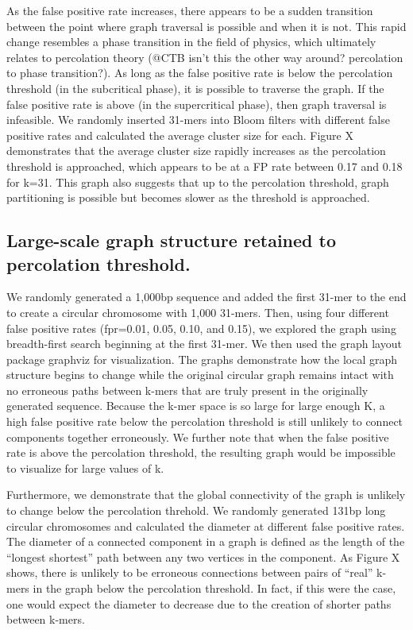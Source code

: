 \documentclass[12pt]{article} \usepackage{simplemargins}
\begin{document}
As the false positive rate increases, there appears to be a sudden
transition between the point where graph traversal is possible and
when it is not. This rapid change resembles a phase transition in the
field of physics, which ultimately relates to percolation theory (@CTB
isn't this the other way around? percolation to phase transition?). As
long as the false positive rate is below the percolation threshold (in
the subcritical phase), it is possible to traverse the graph. If the
false positive rate is above (in the supercritical phase), then graph
traversal is infeasible. We randomly inserted 31-mers into Bloom
filters with different false positive rates and calculated the average
cluster size for each. Figure X demonstrates that the average cluster
size rapidly increases as the percolation threshold is approached,
which appears to be at a FP rate between 0.17 and 0.18 for k=31. This
graph also suggests that up to the percolation threshold, graph
partitioning is possible but becomes slower as the threshold is
approached.

\subsection{Large-scale graph structure retained to percolation threshold.} We
randomly generated a 1,000bp sequence and added the first 31-mer to
the end to create a circular chromosome with 1,000 31-mers. Then,
using four different false positive rates (fpr=0.01, 0.05, 0.10, and
0.15), we explored the graph using breadth-first search beginning at
the first 31-mer. We then used the graph
layout package graphviz for visualization. The graphs demonstrate how
the local graph structure begins to change while the original circular
graph remains intact with no erroneous paths between k-mers that are
truly present in the originally generated sequence. Because the k-mer
space is so large for large enough K, a high false positive rate below
the percolation threshold is still unlikely to connect components
together erroneously. We further note that when the false positive
rate is above the percolation threshold, the resulting graph would be
impossible to visualize for large values of k.

Furthermore, we demonstrate that the global connectivity of the graph is unlikely 
to change below the percolation threhold. We randomly generated 131bp long circular 
chromosomes and calculated the diameter at different false positive rates. The diameter 
of a connected component in a graph is defined as the length of the ``longest shortest'' 
path between any two vertices in the component. As Figure X shows, there is unlikely to 
be erroneous connections between pairs of ``real'' k-mers in the graph below the 
percolation threshold. In fact, if this were the case, one would expect the diameter 
to decrease due to the creation of shorter paths between k-mers.
\end{document}
